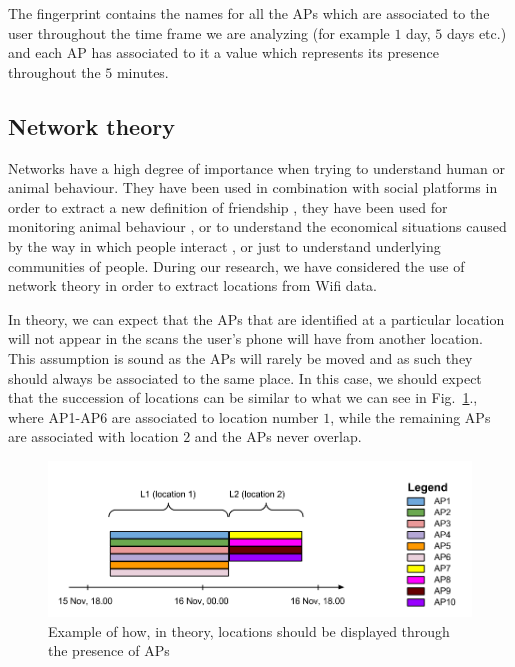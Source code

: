 The fingerprint contains the names for all the APs which are associated to the
user throughout the time frame we are analyzing (for example $1$ day, $5$ days
etc.) and each AP has associated to it a value which represents its presence
throughout the $5$ minutes.

\subsection{Network theory}

Networks have a high degree of importance when trying to understand human or
animal behaviour. They have been used in combination with social platforms in
order to extract a new definition of friendship \cite{cho2011friendship}, they
have been used for monitoring animal behaviour \cite{4116628}, or to understand
the economical situations caused by the way in which people interact
\cite{Copic05identifyingcommunity}, or just to understand underlying communities
of people. During our research, we have considered the use of network theory in
order to extract locations from Wifi data.

In theory, we can expect that the APs that are identified at a particular
location will not appear in the scans the user's phone will have from another
location. This assumption is sound as the APs will rarely be moved and as such
they should always be associated to the same place. In this case, we should
expect that the succession of locations can be similar to what we can see in
Fig.~\ref{user_6_tn}., where AP1-AP6 are associated to location number $1$,
while the remaining APs are associated with location $2$ and the APs never
overlap.

\begin{figure}[!h]
\centering
\includegraphics[width=1\textwidth]{figures/networks/theoretical_network.png}
\caption{Example of how, in theory, locations should be displayed through the
presence of APs}
\label{user_6_tn}
\end{figure}

